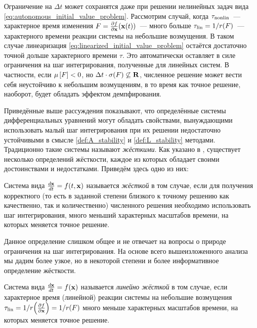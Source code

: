 Ограничение на $ \Delta t $ может сохранятся даже при решении нелинейных задач вида \eqref{eq:autonomous_initial_value_problem}.
Рассмотрим случай, когда $ \tau_{\textnormal{nonlin}} $~--- характерное время изменения $ F = \frac{\partial f}{\partial \mathbf{x}}(\mathbf{x}(t)) $~---
много больше $ \tau_{\textnormal{lin}} = 1/r(F) $~--- характерного времени реакции системы на небольшие возмущения.
В таком случае линеаризация \eqref{eq:linearized_initial_value_problem} остаётся достаточно точной дольше характерного времени $ \tau $.
Это автоматически оставляет в силе ограничения на шаг интегрирования, полученные для линейных систем.
В частности, если $ \mu \left[ F \right] < 0 $, но $ \Delta t \cdot \sigma(F) \not\subseteq \mathbf{R} $, численное решение может вести себя неустойчиво к небольшим возмущениям,
в то время как точное решение, наоборот, будет обладать эффектом демпфирования.

Приведённые выше рассуждения показывают, что определённые системы дифференциальных уравнений могут обладать свойствами,
вынуждающими использовать малый шаг интегрирования при их решении недостаточно устойчивыми в смысле \ref{def:A_stability} и \ref{def:L_stability} методами.
Традиционно такие системы называют \emph{жёсткими}.
Как указано в \cite{heirer1999solvingode2, lambert1991methods}, существует несколько определений жёсткости,
каждое из которых обладает своими достоинствами и недостатками.
Приведём здесь одно из них:

\begin{definition}
    \label{def:stiffness}
    Система вида $ \frac{d \mathbf{x}}{d t} = f(t, \mathbf{x}) $ называется \emph{жёсткой} в том случае,
    если для получения корректного (то есть в заданной степени близкого к точному решению как качественно, так и количественно)
    численного решения необходимо использовать шаг интегрирования,
    много меньший характерных масштабов времени, на которых меняется точное решение.
\end{definition}

Данное определение слишком общее и не отвечает на вопросы о природе ограничения на шаг интегрирования.
На основе всего вышеизложенного анализа мы дадим более узкое, но в некоторой степени и более информативное определение жёсткости.

\begin{definition}
    \label{def:linear_stiffness}
    Система вида $ \frac{d \mathbf{x}}{d t} = f(\mathbf{x}) $ называется \emph{линейно жёсткой} в том случае,
    если характерное время (линейной) реакции системы на небольшие возмущения $ \tau_{\textnormal{lin}} = 1 / r \! \left( \frac{\partial f}{\partial \mathbf{x}} \right) = 1 / r(F) $
    много меньше характерных масштабов времени, на которых меняется точное решение.
\end{definition}


